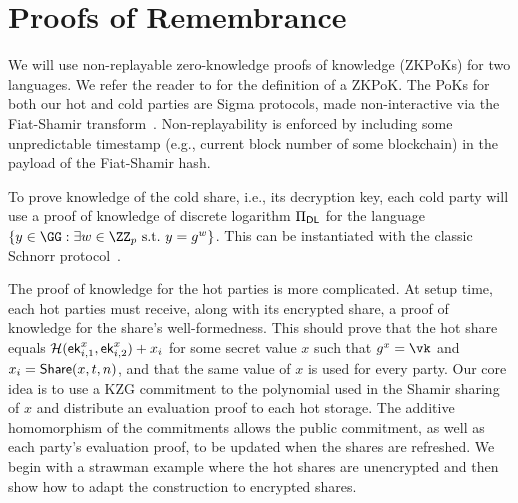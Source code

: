 \section{Proofs of Remembrance}\label{sec:hotproofs}


We will use non-replayable zero-knowledge proofs of knowledge (ZKPoKs) for two languages. We refer the reader to \cite{Thaler23} for the definition of a ZKPoK. The PoKs for both our hot and cold parties are Sigma protocols, made non-interactive via the Fiat-Shamir transform~\cite{C:FiaSha86}. Non-replayability is enforced by including some unpredictable timestamp (e.g., current block number of some blockchain) in the payload of the Fiat-Shamir hash.


To prove knowledge of the cold share, i.e., its decryption key, each cold party will use a proof of knowledge of discrete logarithm $\Pi_{\mathsf{DL}}$ for the language $\{y \in \GG : \exists \witness \in \ZZ_p \suchthat y = g^\witness \}$. This can be instantiated with the classic Schnorr protocol~\cite{C:Schnorr89}.

The proof of knowledge for the hot parties is more complicated. At setup time, each hot parties must receive, along with its encrypted share, a proof of knowledge for the share's well-formedness. This should prove that the hot share equals $\mathcal{H}(\mathsf{ek}_{i,1}^x, \mathsf{ek}_{i,2}^x)+x_i$ for some secret value $x$ such that $g^x = \vk$ and $x_i = \mathsf{Share}(x,t,n)$, and that the same value of $x$ is used for every party. 
Our core idea is to use a KZG commitment to the polynomial used in the Shamir sharing of $x$ and distribute an evaluation proof to each hot storage. The additive homomorphism of the commitments allows the public commitment, as well as each party's evaluation proof, to be updated when the shares are refreshed. 
We begin with a strawman example where the hot shares are unencrypted and then show how to adapt the construction to encrypted shares.

